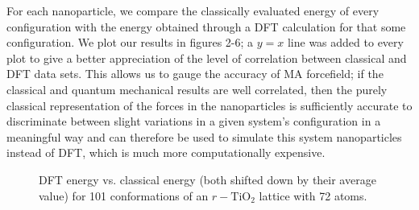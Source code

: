 \documentclass[aps,prb,twocolumn,amsmath,amssymb,superscriptaddress,longbibliography]{revtex4-1}
\newcommand\tab[1][1cm]{\hspace*{#1}} %
\begin{document}
\tab For each nanoparticle, we compare the classically evaluated energy of every configuration with the energy obtained through a DFT calculation for that some configuration. 
We plot our results in figures 2-6; a $y=x$ line was added to every plot to give a better appreciation of the level of correlation between classical and DFT data sets.
This allows us to gauge the accuracy of MA forcefield; if the classical and quantum mechanical results are well correlated, then the purely classical representation of the forces in the nanoparticles is sufficiently accurate to discriminate between slight variations in a given system's configuration in a meaningful way and can therefore be used to simulate this system nanoparticles instead of DFT, which is much more computationally expensive.

\begin{figure}[htb]
\caption{DFT energy vs. classical energy (both shifted down by their average value) for 101 conformations of an $r-\text{TiO}_2$ lattice with 72 atoms.}
\label{rutile72}
\end{figure}
\end{document}
